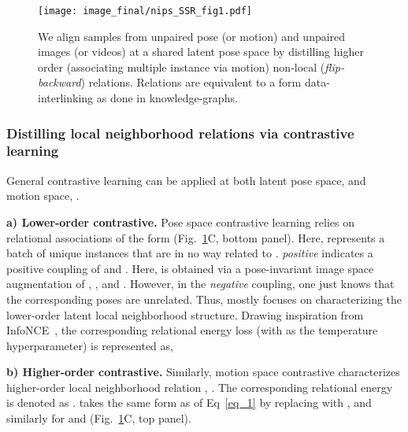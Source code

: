 \documentclass{article}
\begin{document}
\begin{figure}[!t]\begin{center}
\texttt{[image: image\_final/nips\_SSR\_fig1.pdf]}
	\vspace{-4mm}
	\caption{ 
	We align samples from unpaired pose (or motion) and unpaired images (or videos) at a shared latent pose space by distilling higher order (associating multiple instance via motion) non-local (\eg \textit{flip-backward}) relations. Relations are equivalent to a form data-interlinking as done in knowledge-graphs. }
    \vspace{-5mm}
    \label{fig:concept}  
\end{center}
\end{figure}




\vspace{-1mm}
\subsubsection{Distilling local neighborhood relations via contrastive learning} \vspace{-2mm}
General contrastive learning can be applied at both latent pose space,  and motion space,  . 

\textbf{a) Lower-order contrastive.} Pose space contrastive learning relies on relational associations of the form  (Fig.~\ref{fig:concept}{\color{red}C}, bottom panel). Here,  represents a batch of unique instances that are in no way related to . \textit{positive} indicates a positive coupling of  and . Here,  is obtained via a pose-invariant image space augmentation of  \ie, , and . 
However, in the \textit{negative} coupling, one just knows that the corresponding poses are unrelated. 
Thus,  mostly focuses on characterizing the lower-order latent local neighborhood structure. Drawing inspiration from InfoNCE~\cite{oord2018representation}, the corresponding relational energy loss (with  as the temperature hyperparameter) is represented as,

\vspace{-0.5mm}
\noindent
\vspace{-3mm}

\textbf{b) Higher-order contrastive.} Similarly, motion space contrastive characterizes higher-order local neighborhood relation \ie, 
. The corresponding relational energy is denoted as .  takes the same form as of Eq~\ref{eq_1} by replacing  with , and similarly for  and  (Fig.~\ref{fig:concept}{\color{red}C}, top panel).
\end{document}
